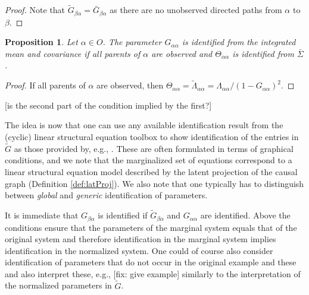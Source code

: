 \documentclass[accepted]{uai2021} %
\newtheorem{prop}[thm]{Proposition}
\begin{document}
\begin{proof}
	Note that $\tilde{G}_{\beta\alpha} = \bar{G}_{\beta\alpha}$ as there are no 
	unobserved directed paths from $\alpha$ to $\beta$.
\end{proof}

\begin{prop}
	Let $\alpha\in O$. The parameter $G_{\alpha\alpha}$ is identified from the 
	integrated mean and covariance if all 
	parents of $\alpha$ are observed and $\Theta_{\alpha\alpha}$ is identified 
	from 
	$\bar{\Sigma}$.
\end{prop}

\begin{proof}
	If all parents of $\alpha$ are observed, then $\Theta_{\alpha\alpha} = 
	\tilde{\Lambda}_{\alpha\alpha} = \Lambda_{\alpha\alpha}/(1 - 
	G_{\alpha\alpha})^2$.
\end{proof}

[is the second part of the condition implied by the first?]

The idea is now 
that one can use any available identification result from the (cyclic) linear 
structural equation toolbox to show identification of the entries in 
$\tilde{G}$ as those provided by, e.g., \cite{foygelHalftrek2012, chenNIPS2016, 
weihs2018}. 
These are often 
formulated in terms of graphical 
conditions, and we note that the 
marginalized set of equations correspond to a linear structural 
equation model described by the latent projection of the causal graph 
(Definition \ref{def:latProj}). We also note that one typically has to 
distinguish between \emph{global} and \emph{generic} identification of 
parameters.


It is immediate that $G_{\beta\alpha}$ is identified if 
$\tilde{G}_{\beta\alpha}$ and $G_{\alpha\alpha}$ are identified. Above the 
conditions ensure that the parameters of the marginal system equals that of the 
original system and therefore identification in the marginal system implies 
identification in the normalized system. One could of course also consider 
identification of parameters that do not occur in the original example and 
these and also interpret these, e.g., [fix: give example] similarly to the 
interpretation of the normalized parameters in $\tilde{G}$.
\end{document}
